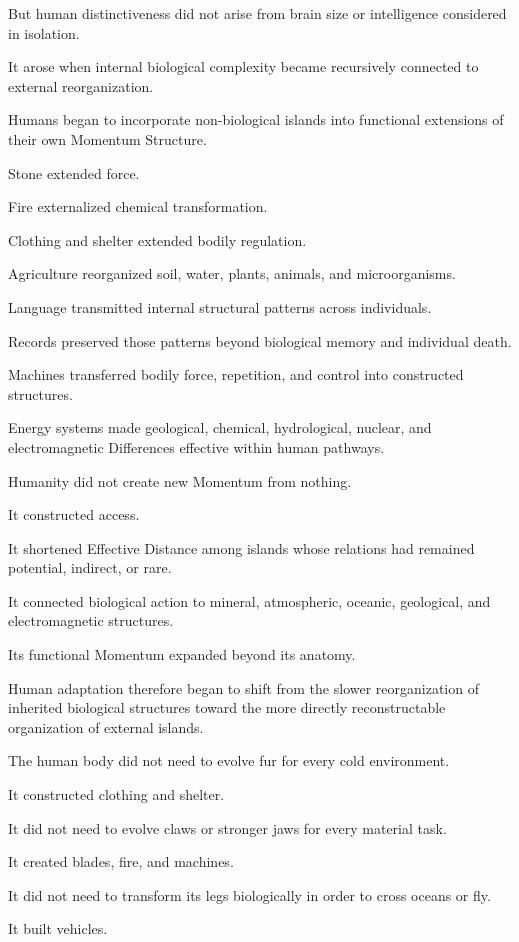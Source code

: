 But human distinctiveness did not arise from brain size or intelligence considered in isolation.

It arose when internal biological complexity became recursively connected to external reorganization.

Humans began to incorporate non-biological islands into functional extensions of their own Momentum Structure.

Stone extended force.

Fire externalized chemical transformation.

Clothing and shelter extended bodily regulation.

Agriculture reorganized soil, water, plants, animals, and microorganisms.

Language transmitted internal structural patterns across individuals.

Records preserved those patterns beyond biological memory and individual death.

Machines transferred bodily force, repetition, and control into constructed structures.

Energy systems made geological, chemical, hydrological, nuclear, and electromagnetic Differences effective within human pathways.

Humanity did not create new Momentum from nothing.

It constructed access.

It shortened Effective Distance among islands whose relations had remained potential, indirect, or rare.

It connected biological action to mineral, atmospheric, oceanic, geological, and electromagnetic structures.

Its functional Momentum expanded beyond its anatomy.

Human adaptation therefore began to shift from the slower reorganization of inherited biological structures toward the more directly reconstructable organization of external islands.

The human body did not need to evolve fur for every cold environment.

It constructed clothing and shelter.

It did not need to evolve claws or stronger jaws for every material task.

It created blades, fire, and machines.

It did not need to transform its legs biologically in order to cross oceans or fly.

It built vehicles.

